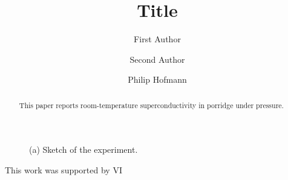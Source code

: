 \documentclass[aps,prl,twocolumn,superscriptaddress]{revtex4-2}
\begin{document}
\title{Title}

\author{First Author}

\author{Second Author}

\author{Philip Hofmann}

\begin{abstract}
This paper reports room-temperature superconductivity in porridge under pressure. 
\end{abstract}
\maketitle


\begin{figure}
  \caption{(a) Sketch of the experiment. 
  }
  \label{fig:1}
\end{figure}
\begin{acknowledgments}
  This work was supported by VI\end{acknowledgments}
% 
\end{document}
